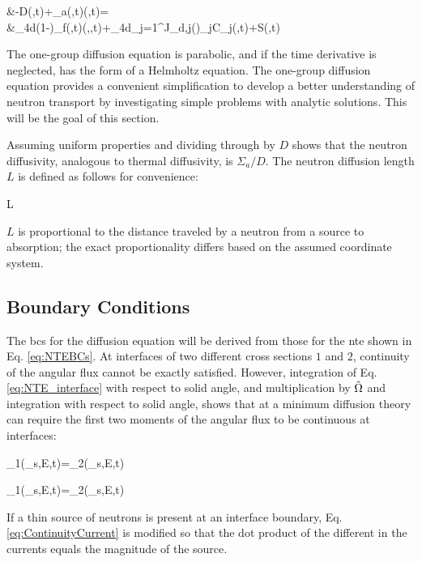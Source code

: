 \beqa
\label{eq:1GDiffusionEquation}
&-\nabla\cdot\left\lbrack D\nabla\phi(,t)\right\rbrack+\Sigma_a(,t)\phi(,t)=\\
&\hspace{1cm}\int_{4\pi}d\hO(1-\beta)\nu\Sigma_f(,t)\phi(,\hO,t)+\int_{4\pi}d\hO\sum_{j=1}^J\chi_{d,j}(\hO)\lambda_jC_j(,t)+S(,t)
\eeqa

The one-group diffusion equation is parabolic, and if the time derivative is neglected, has the form of a Helmholtz equation. The one-group diffusion equation provides a convenient simplification to develop a better understanding of neutron transport by investigating simple problems with analytic solutions. This will be the goal of this section. 


Assuming uniform properties and dividing through by \(D\) shows that the neutron diffusivity, analogous to thermal diffusivity, is \(\Sigma_a/D\). The neutron diffusion length \(L\) is defined as follows for convenience:

\beq
\label{eq:DiffusionLength}
L\equiv{}
\eeq

\(L\) is proportional to the distance traveled by a neutron from a source to absorption; the exact proportionality differs based on the assumed coordinate system. 

\subsection{Boundary Conditions}

The \glspl{bc} for the diffusion equation will be derived from those for the \gls{nte} shown in Eq. \eqref{eq:NTEBCs}. At interfaces of two different cross sections \(1\) and \(2\), continuity of the angular flux cannot be exactly satisfied. However, integration of Eq. \eqref{eq:NTE_interface} with respect to solid angle, and multiplication by \(\hat{\Omega}\) and integration with respect to solid angle, shows that at a minimum diffusion theory can require the first two moments of the angular flux to be continuous at interfaces:

\beq
\phi_1(_s,E,t)=\phi_2(_s,E,t)
\eeq

\beq
\label{eq:ContinuityCurrent}
_1(_s,E,t)=_2(_s,E,t)
\eeq

If a thin source of neutrons is present at an interface boundary, Eq. \eqref{eq:ContinuityCurrent} is modified so that the dot product of the different in the currents equals the magnitude of the source.

